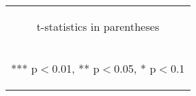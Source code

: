\documentclass[border=0.2cm]{standalone}
\begin{document}
\begin{tabular}{lcccccc}
    \bottomrule
    \multicolumn{7}{c}{\begin{footnotesize} t-statistics in parentheses\end{footnotesize}}                                                                                                                                                                                                                                  \\
    \multicolumn{7}{c}{\begin{footnotesize} *** p$<$0.01, ** p$<$0.05, * p$<$0.1\end{footnotesize}}                                                                                                                                                                                                                         \\
\end{tabular}
\end{document}
